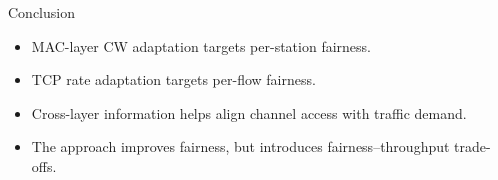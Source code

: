 \begin{frame}{Conclusion}


\vspace{0.35cm}

\begin{itemize}
    \item MAC-layer CW adaptation targets per-station fairness.
    \item TCP rate adaptation targets per-flow fairness.
    \item Cross-layer information helps align channel access with traffic demand.
    \item The approach improves fairness, but introduces fairness--throughput trade-offs.
\end{itemize}
\end{frame}
